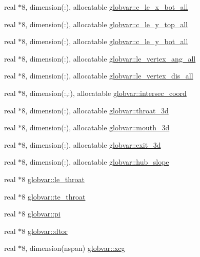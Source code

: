 \begin{DoxyCompactItemize}
\item 
real $\ast$8, dimension(\+:), allocatable \hyperlink{namespaceglobvar_aec9bec955f6acfec428227dba9b7853d}{globvar\+::c\+\_\+le\+\_\+x\+\_\+bot\+\_\+all}
\item 
real $\ast$8, dimension(\+:), allocatable \hyperlink{namespaceglobvar_a3675f2363320e97186b54bdf83c57fe0}{globvar\+::c\+\_\+le\+\_\+y\+\_\+top\+\_\+all}
\item 
real $\ast$8, dimension(\+:), allocatable \hyperlink{namespaceglobvar_a1e99d4cf7e322ee5f4febfa67e23249a}{globvar\+::c\+\_\+le\+\_\+y\+\_\+bot\+\_\+all}
\item 
real $\ast$8, dimension(\+:), allocatable \hyperlink{namespaceglobvar_a7d4d625f7e3e19483e2e9c240a928d2e}{globvar\+::le\+\_\+vertex\+\_\+ang\+\_\+all}
\item 
real $\ast$8, dimension(\+:), allocatable \hyperlink{namespaceglobvar_a21aa33a09bc33a7e6c7fcb16ca4b9ecf}{globvar\+::le\+\_\+vertex\+\_\+dis\+\_\+all}
\item 
real $\ast$8, dimension(\+:,\+:), allocatable \hyperlink{namespaceglobvar_ad35c726e5eed845b38c59490c65bd02e}{globvar\+::intersec\+\_\+coord}
\item 
real $\ast$8, dimension(\+:), allocatable \hyperlink{namespaceglobvar_a96fc48391a183ef7111ef81f05d289a5}{globvar\+::throat\+\_\+3d}
\item 
real $\ast$8, dimension(\+:), allocatable \hyperlink{namespaceglobvar_aca439d842ea97d1d7e30e6e925fddd19}{globvar\+::mouth\+\_\+3d}
\item 
real $\ast$8, dimension(\+:), allocatable \hyperlink{namespaceglobvar_a76a4a0e1d9be5d28829cd29c3e41a533}{globvar\+::exit\+\_\+3d}
\item 
real $\ast$8, dimension(\+:), allocatable \hyperlink{namespaceglobvar_ae3e1714c3ebebc9e95b28edd32df9f8e}{globvar\+::hub\+\_\+slope}
\item 
real $\ast$8 \hyperlink{namespaceglobvar_ae2d9b98958aa2b453bdcb189a5b8b140}{globvar\+::le\+\_\+throat}
\item 
real $\ast$8 \hyperlink{namespaceglobvar_a9eef0dca95de0a13eb716ae8aef154c5}{globvar\+::te\+\_\+throat}
\item 
real $\ast$8 \hyperlink{namespaceglobvar_a201c98f02f6744953f40e1c007630bc0}{globvar\+::pi}
\item 
real $\ast$8 \hyperlink{namespaceglobvar_a3346ec2679bdcc117cc6b09e8eb2a7dd}{globvar\+::dtor}
\item 
real $\ast$8, dimension(nspan) \hyperlink{namespaceglobvar_a7e4a1b87658252043b32443ffafb3ddf}{globvar\+::xcg}

\end{DoxyCompactItemize}
